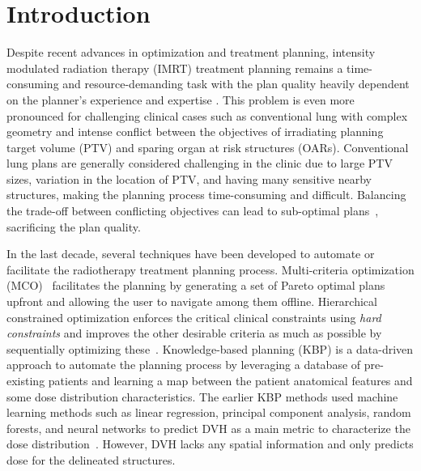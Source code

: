 \documentclass[10pt]{article}
\begin{document}

\section{Introduction}
Despite recent advances in optimization and treatment planning, intensity modulated radiation therapy (IMRT) treatment planning remains a time-consuming and resource-demanding task with the plan quality heavily dependent on the planner's experience and expertise \cite{berry2016interobserver,das2009analysis, nelms2012variation}. This problem is even more pronounced for challenging clinical cases such as conventional lung with complex geometry and intense conflict between the objectives of irradiating planning target volume (PTV) and sparing organ at risk structures (OARs). Conventional lung plans are generally considered challenging in the clinic due to large PTV sizes, variation in the location of PTV, and having many sensitive nearby structures, making the planning process time-consuming and difficult. Balancing the trade-off between conflicting objectives can lead to sub-optimal plans~\cite{moore2015quantifying}, sacrificing the plan quality. 

In the last decade, several techniques have been developed to automate or facilitate the radiotherapy treatment planning process. Multi-criteria optimization (MCO)~\cite{craft2008many} facilitates the planning by generating a set of Pareto optimal plans upfront and allowing the user to navigate among them offline. Hierarchical constrained optimization enforces the critical clinical constraints using \textit{hard constraints} and improves the other desirable criteria as much as possible by sequentially optimizing these~\cite{zarepisheh2019automated, breedveld2009equivalence}. Knowledge-based planning (KBP) is a data-driven approach to automate the planning process by leveraging a database of pre-existing patients and learning a map between the patient anatomical features and some dose distribution characteristics. The earlier KBP methods used machine learning methods such as linear regression, principal component analysis, random forests, and neural networks to predict DVH as a main metric to characterize the dose distribution~\cite{DVH1,DVH2,DVH3,DVH4,DVH5,DVH6,DVH7}. However, DVH lacks any spatial information and only predicts dose for the delineated structures. 
\end{document}
